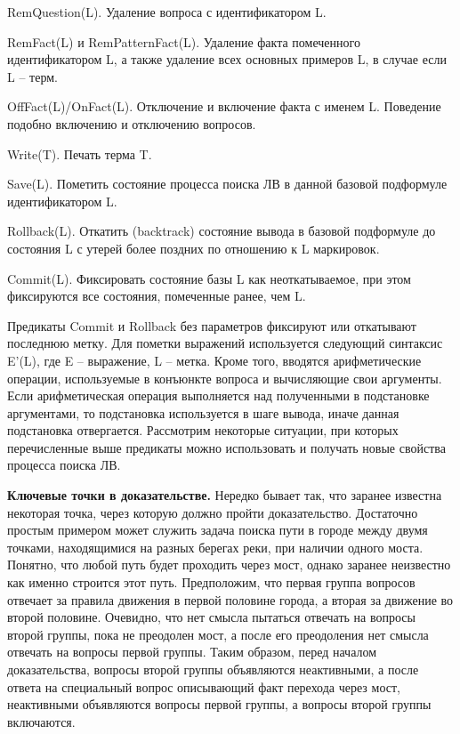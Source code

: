 RemQuestion(L). Удаление вопроса с идентификатором L. 

RemFact(L) и RemPatternFact(L). Удаление факта помеченного идентификатором L, а также удаление всех основных примеров L, в случае если L – терм. 

OffFact(L)/OnFact(L). Отключение и включение факта с именем L. Поведение подобно включению и отключению вопросов.

Write(T). Печать терма T.

Save(L). Пометить состояние процесса поиска ЛВ в данной базовой подформуле идентификатором L.

Rollback(L). Откатить (backtrack) состояние вывода в базовой подформуле до состояния L с утерей более поздних по отношению к L маркировок.

Commit(L). Фиксировать состояние базы L как неоткатываемое, при этом фиксируются все состояния, помеченные ранее, чем L. 

Предикаты Commit и Rollback без параметров фиксируют или откатывают последнюю метку.
Для пометки выражений используется следующий синтаксис E’(L), где E – выражение, L – метка.
Кроме того, вводятся арифметические операции, используемые в конъюнкте вопроса и вычисляющие свои аргументы. Если арифметическая операция выполняется над полученными в подстановке аргументами, то подстановка используется в шаге вывода, иначе данная подстановка отвергается.
Рассмотрим некоторые ситуации, при которых перечисленные выше предикаты можно использовать и получать новые свойства процесса поиска ЛВ.

\textbf{Ключевые точки в доказательстве.} Нередко бывает так, что заранее известна некоторая точка, через которую должно пройти доказательство. Достаточно простым примером может служить задача поиска пути в городе между двумя точками, находящимися на разных берегах реки, при наличии одного моста. Понятно, что любой путь будет проходить через мост, однако заранее неизвестно как именно строится этот путь. Предположим, что первая группа вопросов отвечает за правила движения в первой половине города, а вторая за движение во второй половине. Очевидно, что нет смысла пытаться отвечать на вопросы второй группы, пока не преодолен мост, а после его преодоления нет смысла отвечать на вопросы первой группы. Таким образом, перед началом доказательства, вопросы второй группы объявляются неактивными, а после ответа на специальный вопрос описывающий факт перехода через мост, неактивными объявляются вопросы первой группы, а вопросы второй группы включаются. 

